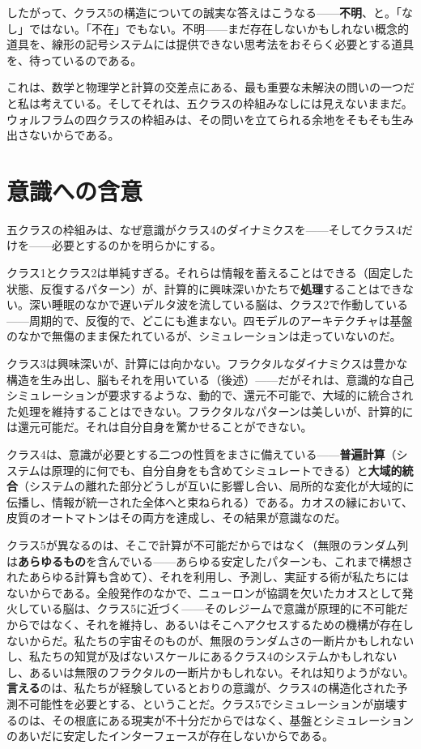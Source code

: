\documentclass[11pt, twoside, openright]{book}
\begin{document}
したがって、クラス5の構造についての誠実な答えはこうなる------\textbf{不明}、と。「なし」ではない。「不在」でもない。不明------まだ存在しないかもしれない概念的道具を、線形の記号システムには提供できない思考法をおそらく必要とする道具を、待っているのである。

これは、数学と物理学と計算の交差点にある、最も重要な未解決の問いの一つだと私は考えている。そしてそれは、五クラスの枠組みなしには見えないままだ。ウォルフラムの四クラスの枠組みは、その問いを立てられる余地をそもそも生み出さないからである。

\section*{意識への含意}

五クラスの枠組みは、なぜ意識がクラス4のダイナミクスを------そしてクラス4だけを------必要とするのかを明らかにする。

クラス1とクラス2は単純すぎる。それらは情報を蓄えることはできる（固定した状態、反復するパターン）が、計算的に興味深いかたちで\textbf{処理}することはできない。深い睡眠のなかで遅いデルタ波を流している脳は、クラス2で作動している------周期的で、反復的で、どこにも進まない。四モデルのアーキテクチャは基盤のなかで無傷のまま保たれているが、シミュレーションは走っていないのだ。

クラス3は興味深いが、計算には向かない。フラクタルなダイナミクスは豊かな構造を生み出し、脳もそれを用いている（後述）------だがそれは、意識的な自己シミュレーションが要求するような、動的で、還元不可能で、大域的に統合された処理を維持することはできない。フラクタルなパターンは美しいが、計算的には還元可能だ。それは自分自身を驚かせることができない。

クラス4は、意識が必要とする二つの性質をまさに備えている------\textbf{普遍計算}（システムは原理的に何でも、自分自身をも含めてシミュレートできる）と\textbf{大域的統合}（システムの離れた部分どうしが互いに影響し合い、局所的な変化が大域的に伝播し、情報が統一された全体へと束ねられる）である。カオスの縁において、皮質のオートマトンはその両方を達成し、その結果が意識なのだ。

クラス5が異なるのは、そこで計算が不可能だからではなく（無限のランダム列は\textbf{あらゆるもの}を含んでいる------あらゆる安定したパターンも、これまで構想されたあらゆる計算も含めて）、それを利用し、予測し、実証する術が私たちにはないからである。全般発作のなかで、ニューロンが協調を欠いたカオスとして発火している脳は、クラス5に近づく------そのレジームで意識が原理的に不可能だからではなく、それを維持し、あるいはそこへアクセスするための機構が存在しないからだ。私たちの宇宙そのものが、無限のランダムさの一断片かもしれないし、私たちの知覚が及ばないスケールにあるクラス4のシステムかもしれないし、あるいは無限のフラクタルの一断片かもしれない。それは知りようがない。\textbf{言える}のは、私たちが経験しているとおりの意識が、クラス4の構造化された予測不可能性を必要とする、ということだ。クラス5でシミュレーションが崩壊するのは、その根底にある現実が不十分だからではなく、基盤とシミュレーションのあいだに安定したインターフェースが存在しないからである。
\end{document}
